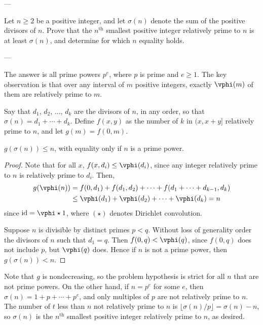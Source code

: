 
---

Let $n\ge2$ be a positive integer, and let $\sigma(n)$ denote the sum of the positive divisors of $n$. Prove that the $n^\text{th}$ smallest positive integer relatively prime to $n$ is at least $\sigma(n)$, and determine for which $n$ equality holds.

---

The answer is all prime powers $p^e$, where $p$ is prime and $e\ge1$. The key observation is that over any interval of $m$ positive integers, exactly $\vphi(m)$ of them are relatively prime to $m$.

Say that $d_1$, $d_2$, $\ldots$, $d_k$ are the divisors of $n$, in any order, so that $\sigma(n)=d_1+\cdots+d_k$. Define $f(x,y)$ as the number of $k$ in $(x,x+y]$ relatively prime to $n$, and let $g(m)=f(0,m)$.
\begin{iclaim*}
    $g(\sigma(n))\le n$, with equality only if $n$ is a prime power.
\end{iclaim*}
\begin{proof}
    Note that for all $x$, $f(x,d_i)\le\vphi(d_i)$, since any integer relatively prime to $n$ is relatively prime to $d_i$. Then,
    \begin{align*}
        g(\vphi(n))&=f(0,d_1)+f(d_1,d_2)+\cdots+f(d_1+\cdots+d_{k-1},d_k)\\
        &\le\vphi(d_1)+\vphi(d_2)+\cdots+\vphi(d_k)=n
    \end{align*}
    since $\operatorname{id}=\vphi\star1$, where $(\star)$ denotes Dirichlet convolution.

    Suppose $n$ is divisible by distinct primes $p<q$. Without loss of generality order the divisors of $n$ such that $d_1=q$. Then $f(0,q)<\vphi(q)$, since $f(0,q)$ does not include $p$, but $\vphi(q)$ does. Hence if $n$ is not a prime power, then $g(\sigma(n))<n$.
\end{proof}

Note that $g$ is nondecreasing, so the problem hypothesis is strict for all $n$ that are not prime powers. On the other hand, if $n=p^e$ for some $e$, then $\sigma(n)=1+p+\cdots+p^e$, and only multiples of $p$ are not relatively prime to $n$. The number of $t$ less than $n$ not relatively prime to $n$ is $\lfloor\sigma(n)/p\rfloor=\sigma(n)-n$, so $\sigma(n)$ is the $n^\text{th}$ smallest positive integer relatively prime to $n$, as desired.

